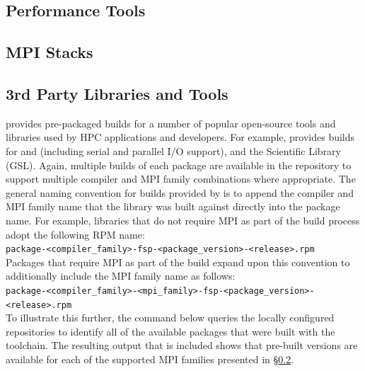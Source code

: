 \documentclass[letterpaper]{article}
\newcommand{\install}{zypper -n install}
\begin{document}
\subsection{Performance Tools} \label{sec:install_perf_tools}


\subsection{MPI Stacks} \label{sec:mpi}



\subsection{3rd Party Libraries and Tools} \label{sec:3rdparty}

\FSP{} provides pre-packaged builds for a number of popular open-source
tools and libraries used by HPC applications and developers. For
example, \FSP{} provides builds for \FFTW{} and \hdffive{} (including serial and parallel
I/O support), and the \GNU{} Scientific Library (GSL). Again, multiple builds of
each package are available in the \FSP{} repository to support multiple compiler
and MPI family combinations where appropriate. The general naming convention
for builds provided by \FSP{} is to append the compiler and MPI family name that
the library was built against directly into the package name. For example,
libraries that do not require MPI as part of the build process adopt the
following RPM name: \\

\noindent
\texttt{package-<compiler\_family>-fsp-<package\_version>-<release>.rpm} \\

\noindent Packages that require MPI as part of the build expand upon this convention to
additionally include the MPI family name as follows: \\

\noindent
\texttt{package-<compiler\_family>-<mpi\_family>-fsp-<package\_version>-<release>.rpm} \\

To illustrate this further, the command below queries the locally configured
repositories to identify all of the available \FFTW{} packages that were built
with the \GNU{} toolchain. The resulting output that is included shows that
pre-built versions are available for each of the supported MPI families
presented in \S\ref{sec:mpi}.
\end{document}
